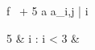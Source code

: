 \documentclass[12pt,a4paper]{book}
\begin{document}
\begin{eqcode}{f}{\ }{}{}
  \alpha \in {} \lend
  \alpha {} + 5 \lend
  \omega \gets a \lend
   \lend
  a_{i,j} | \forall i \gets
  \begin{cases}
  5 & i : i < 3  & \otherwise \lend
  \end{cases} \lend
\end{eqcode}
\end{document}
